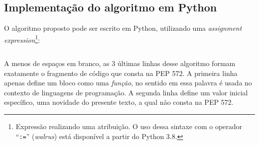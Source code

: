 \subsection*{Implementação do algoritmo em Python}

O algoritmo proposto pode ser escrito em Python,
utilizando uma \emph{assignment expression}\footnote{
  Expressão realizando uma atribuição.
  O uso dessa sintaxe com o operador ``\texttt{:=}'' (\emph{walrus})
  está disponível a partir do Python 3.8.
}:

\begin{center}
  \begin{minipage}{7cm}
    \inputminted{python}{nth_root.py}
  \end{minipage}
\end{center}

A menos de espaços em branco,
as $3$ últimas linhas desse algoritmo
formam exatamente o fragmento de código que consta na PEP 572.
A primeira linha apenas define um bloco como uma \emph{função},
no sentido em essa palavra é usada
no contexto de linguagens de programação.
A segunda linha define um valor inicial específico,
uma novidade do presente texto, a qual não consta na PEP 572.
